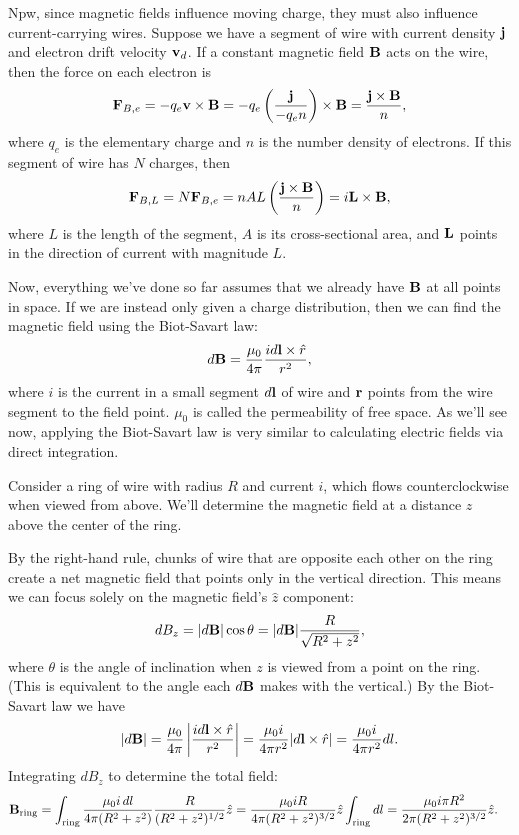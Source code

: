 \documentclass[../p051main.tex]{subfiles}
\begin{document}
Npw, since magnetic fields influence moving charge, they must also influence current-carrying wires.
Suppose we have a segment of wire with current density $\mathbf{j}$ and electron drift velocity $\mathbf{v}_d$.
If a constant magnetic field $\mathbf{B}$ acts on the wire, then the force on each electron is
\[ \mathbf{F}_{B,e} = -q_e \mathbf{v} \times \mathbf{B} = -q_e \left( \frac{\mathbf{j}}{-q_e n} \right) \times \mathbf{B} = \frac{\mathbf{j} \times \mathbf{B}}{n}, \]
where $q_e$ is the elementary charge and $n$ is the number density of electrons.
If this segment of wire has $N$ charges, then
\[ \mathbf{F}_{B,L} = N \mathbf{F}_{B,e} = nAL \left( \frac{\mathbf{j} \times \mathbf{B}}{n} \right) = i\mathbf{L} \times \mathbf{B}, \]
where $L$ is the length of the segment, $A$ is its cross-sectional area, and $\mathbf{L}$ points in the direction of current with magnitude $L$.

Now, everything we've done so far assumes that we already have $\mathbf{B}$ at all points in space.
If we are instead only given a charge distribution, then we can find the magnetic field using the Biot-Savart law:
\[ d\mathbf{B} = \frac{\mu_0}{4\pi} \frac{i d\mathbf{l} \times \hat r}{r^2}, \]
where $i$ is the current in a small segment $d\mathbf{l}$ of wire and $\mathbf{r}$ points from the wire segment to the field point.
$\mu_0$ is called the permeability of free space.
As we'll see now, applying the Biot-Savart law is very similar to calculating electric fields via direct integration.

\begin{example}
    Consider a ring of wire with radius $R$ and current $i$, which flows counterclockwise when viewed from above.
    We'll determine the magnetic field at a distance $z$ above the center of the ring.

    By the right-hand rule, chunks of wire that are opposite each other on the ring create a net magnetic field that points only in the vertical direction.
    This means we can focus solely on the magnetic field's $\hat z$ component:
    \[ dB_z = |d\mathbf{B}| \cos \theta = |d\mathbf{B}| \frac{R}{\sqrt{R^2 + z^2}}, \]
    where $\theta$ is the angle of inclination when $z$ is viewed from a point on the ring.
    (This is equivalent to the angle each $d\mathbf{B}$ makes with the vertical.)
    By the Biot-Savart law we have
    \[ |d\mathbf{B}| = \frac{\mu_0}{4\pi} \left| \frac{i d\mathbf{l} \times \hat r}{r^2} \right| = \frac{\mu_0 i }{4\pi r^2} |d\mathbf{l} \times \hat r| = \frac{\mu_0 i}{4\pi r^2} dl. \]
    Integrating $dB_z$ to determine the total field:
    \begin{align*}
        \mathbf{B}_\textrm{ring} &= \int_\textrm{ring} \frac{\mu_0 i \,dl}{4\pi (R^2 + z^2)} \frac{R}{(R^2 + z^2)^{1/2}} \hat{z} = \frac{\mu_0 i R}{4\pi (R^2 + z^2)^{3/2}} \hat{z} \int_\textrm{ring} dl = \frac{\mu_0 i \pi R^2}{2\pi (R^2 + z^2)^{3/2}} \hat{z}.
    \end{align*}
\end{example}
\end{document}
